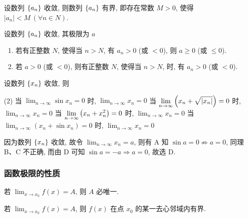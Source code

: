 \begin{theorem}[数列极限的有界性]
    设数列 $\qty{a_n}$ 收敛, 则数列 $\qty{a_n}$ 有界, 即存在常数 $M>0$, 使得 $|a_n|<M~(\forall n\in N)$.
\end{theorem}

\begin{theorem}[数列极限的保号性]
    设数列 $\qty{a_n}$ 收敛, 其极限为 $a$
    \begin{enumerate}[label=(\arabic{*})]
        \item 若有正整数 $N$, 使得当 $n>N$, 有 $a_n>0$ (或 $<0$), 则 $a\geqslant 0$ (或 $\leqslant 0$).
        \item 若 $a>0$ (或 $<0$), 则有正整数 $N$, 使得当 $n>N$, 时, 有 $a_n>0$ (或 $<0$).
    \end{enumerate}
\end{theorem}

\begin{example}[2017 数二]
    设数列 $\qty{x_n}$ 收敛, 则 
    \begin{tasks}(2)
        \task 当 $\displaystyle\lim_{n\to\infty}\sin x_n=0$ 时, $\displaystyle\lim_{n\to\infty}x_n=0$
        \task 当 $\displaystyle\lim_{n\to\infty}\qty(x_n+\sqrt{|x_n|})=0$ 时, $\displaystyle\lim_{n\to\infty}x_n=0$
        \task 当 $\displaystyle\lim_{n\to\infty}\qty(x_n+x_n^2)=0$ 时, $\displaystyle\lim_{n\to\infty}x_n=0$
        \task 当 $\displaystyle\lim_{n\to\infty}(x_n+\sin x_n)=0$ 时, $\displaystyle\lim_{n\to\infty}x_n=0$
    \end{tasks}
\end{example}
\begin{solution}
    因为数列 $\qty{x_n}$ 收敛, 故令 $\displaystyle\lim_{n\to\infty}x_n=a$, 则有 A 知 $\sin a=0\not\Rightarrow a=0$, 同理 B、C 不正确, 而由 D 可知 $\sin a=-a\Rightarrow a=0$, 故选 D.
\end{solution}

\subsubsection{函数极限的性质}

\begin{theorem}[函数极限的唯一性]
    若 $\displaystyle\lim_{x\to x_0}f(x)=A$, 则 $A$ 必唯一.
\end{theorem}

\begin{theorem}[函数极限的有界性]
    若 $\displaystyle\lim_{x\to x_0}f(x)=A$, 则 $f(x)$ 在点 $x_0$ 的某一去心邻域内有界.
\end{theorem}

